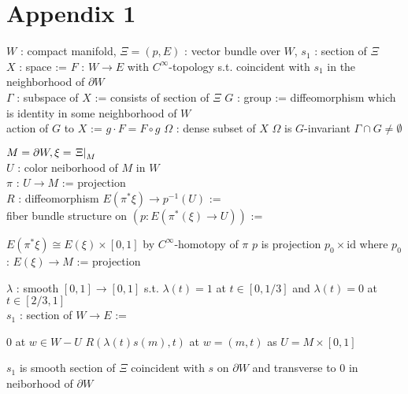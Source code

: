 \documentclass[dvipdfmx]{jsarticle}
\begin{document}
\section{Appendix 1}

\begin{Theorem}
\itemwhen
  \For \(W\) : compact manifold, \(\Xi = (p, E)\) : vector bundle over \(W\), \(s_1\) : section of \(\Xi\) \\
  \Let \(X\) : space := \(F\) : \(W \to E\) with \(C^\infty\)-topology s.t. coincident with \(s_1\) in the neighborhood of \(\partial W\) \\
  \Let \(\Gamma\) : subspace of \(X\) := consists of section of \(\Xi\)
  \Let \(G\) : group := diffeomorphism which is identity in some neighborhood of \(W\) \\
  \Let action of \(G\) to \(X\) := \(g \cdot F = F \circ g\)
  \For \(\Omega\) : dense subset of \(X\)
  \IfHold \(\Omega\) is \(G\)-invariant
\itemprop
  \Then \(\Gamma \cap G \not = \emptyset\)
\end{Theorem}

\begin{Theorem}
\itemwhen
  \For \(M = \partial W, \xi = \left. {\Xi} \right| _{M}\) \\
  \For \(U\) : color neiborhood of \(M\) in \(W\) \\
  \Let \(\pi\) : \(U \to M\) := projection \\
  \Let \(R\) : diffeomorphism \(E(\pi^* \xi) \to p^{-1}(U)\) :=  \\
\itemprop
  \Let fiber bundle structure on \((p : E(\pi^*(\xi) \to U))\) := 
  \begin{itemize}
    \itemenum \(E(\pi^*\xi) \cong E(\xi) \times [0,1]\) by \(C^\infty\)-homotopy of \(\pi\)
    \itemenum \(p\) is projection \(p_0 \times \text{id}\) where \(p_0\) : \(E(\xi) \to M\) := projection 
  \end{itemize}
\end{Theorem}

\begin{Theorem}
\itemwhen
  \For \(\lambda\) : smooth \([0,1] \to [0,1]\) s.t. \(\lambda(t) = 1\) at \(t \in [0, 1/3]\) and \(\lambda(t) = 0\) at \(t \in [2/3, 1]\) \\
  \Let \(s_1\) : section of \(W \to E\) :=
  \begin{itemize}
    \itemenum \(0\) at \(w \in W - U\)
    \itemenum \(R(\lambda(t) s(m), t)\) at \(w = (m,t)\) as \(U = M \times [0,1]\)
  \end{itemize}
\itemprop
  \Then \(s_1\) is smooth section of \(\Xi\) coincident with \(s\) on \(\partial W\) and transverse to \(0\) in neiborhood of \(\partial W\) \\
\end{Theorem}
\end{document}
